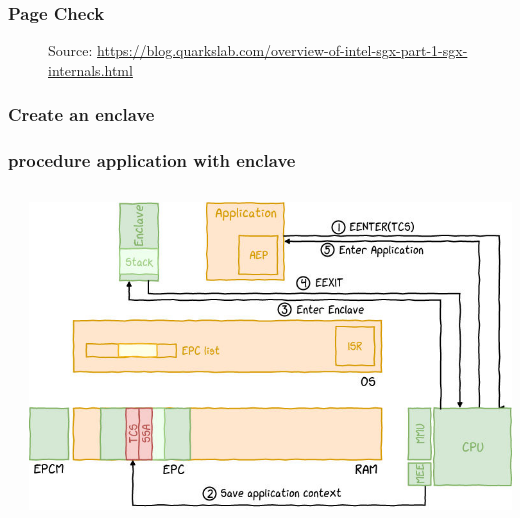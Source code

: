 \begin{frame}
    \frametitle{Page Check}
    \begin{figure}
        \centering
        \caption*{Source: \url{https://blog.quarkslab.com/overview-of-intel-sgx-part-1-sgx-internals.html}}
    \end{figure}
\end{frame}

\begin{frame}
    \frametitle{Create an enclave}

\end{frame}

\begin{frame}
    \frametitle{procedure application with enclave}
    \begin{columns}
        \begin{column}{0.3\textwidth}
           \begin{enumerate}
           \end{enumerate}
        \end{column}
        \begin{column}{0.7\textwidth}
            \begin{center}
                \includegraphics[scale=0.35]{Images/procedure.png}
            \end{center}
        \end{column}
        \end{columns}
\end{frame}

